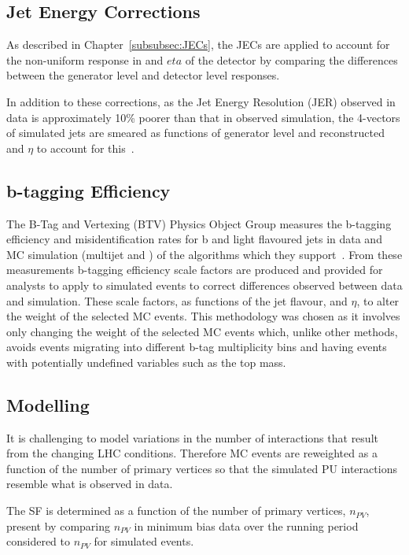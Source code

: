 \subsection{Jet Energy Corrections}\label{subsec:jesjer}
As described in Chapter~\ref{subsubsec:JECs}, the JECs are applied to account for the non-uniform response in \pT and $eta$ of the detector by comparing the differences between the generator level and detector level responses.

In addition to these corrections, as the Jet Energy Resolution (JER) observed in data is approximately 10\% poorer than that in observed simulation, the 4-vectors of simulated jets are smeared as functions of generator level and reconstructed \pt and $\eta$ to account for this~\cite{Khachatryan:2016kdb}.

\subsection{b-tagging Efficiency}\label{subsec:btagEff}
The B-Tag and Vertexing (BTV) Physics Object Group measures the b-tagging efficiency and misidentification rates for b and light flavoured jets in data and MC simulation (multijet and \ttbar) of the algorithms which they support~\cite{Sirunyan:2017ezt}.
From these measurements b-tagging efficiency scale factors are produced and provided for analysts to apply to simulated events to correct differences observed between data and simulation.
These scale factors, as functions of the jet flavour, \pT and $\eta$, to alter the weight of the selected MC events.
This methodology was chosen as it involves only changing the weight of the selected MC events which, unlike other methods, avoids events migrating into different b-tag multiplicity bins and having events with potentially undefined variables such as the top mass.

\subsection{\PU Modelling}\label{subsec:puSF}
It is challenging to model variations in the number of \PU interactions that result from the changing LHC conditions.
Therefore MC events are reweighted as a function of the number of primary vertices so that the simulated PU interactions resemble what is observed in data.

The \PU SF is determined as a function of the number of primary vertices, $n_{PV}$, present by comparing $n_{PV}$ in minimum bias data over the running period considered to $n_{PV}$ for simulated events.

